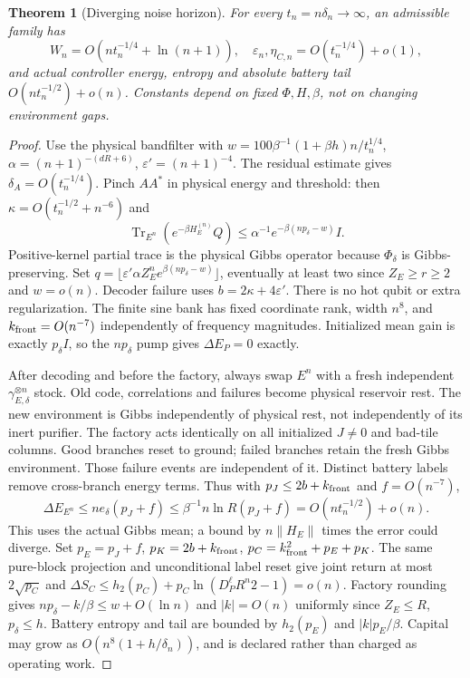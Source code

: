 \documentclass[11pt]{article}
\newtheorem{theorem}{Theorem}
\theoremstyle{definition}
\theoremstyle{remark}
\newcommand{\Tr}{\operatorname{Tr}}
\providecommand{\h}{h_2}
\begin{document}
\begin{theorem}[Diverging noise horizon]\label{bp-noisesuff}
For every $t_n=n\delta_n\to\infty$, an admissible family has
\[
 W_n=O(nt_n^{-1/4}+\ln(n+1)),\quad
 \varepsilon_n,\eta_{C,n}=O(t_n^{-1/4})+o(1),
\]
and actual controller energy, entropy and absolute battery tail
$O(nt_n^{-1/2})+o(n)$. Constants depend on fixed $\Phi,H,\beta$,
not on changing environment gaps.
\end{theorem}
\begin{proof}
Use the physical bandfilter with
$w=100\beta^{-1}(1+\beta h)n/t_n^{1/4}$,
$\alpha=(n+1)^{-(dR+6)}$, $\varepsilon'=(n+1)^{-4}$.
The residual estimate gives $\delta_A=O(t_n^{-1/4})$.
Pinch $AA^*$ in physical energy and threshold: then
$\kappa=O(t_n^{-1/2}+n^{-6})$ and
\[
 \Tr_{E^n}(e^{-\beta H_E^{(n)}}Q)
       \le\alpha^{-1}e^{-\beta(np_\delta-w)}I.
\]
Positive-kernel partial trace is the physical Gibbs operator because
$\Phi_\delta$ is Gibbs-preserving. Set
$q=\lfloor\varepsilon'\alpha Z_E^n e^{\beta(np_\delta-w)}\rfloor$,
eventually at least two since $Z_E\ge r\ge2$ and $w=o(n)$.
Decoder failure uses $b=2\kappa+4\varepsilon'$.
There is no hot qubit or extra regularization. The finite sine bank
has fixed coordinate rank, width $n^8$, and
$k_{\rm front}=O(n^{-7})$ independently of frequency magnitudes.
Initialized mean gain is exactly $p_\delta I$, so the
$np_\delta$ pump gives $\Delta E_P=0$ exactly.

After decoding and before the factory, always swap $E^n$ with a
fresh independent $\gamma_{E,\delta}^{\otimes n}$ stock.
Old code, correlations and failures become physical reservoir rest.
The new environment is Gibbs independently of physical rest, not
independently of its inert purifier. The factory acts identically
on all initialized $J\ne0$ and bad-tile columns.
Good branches reset to ground; failed branches retain the fresh
Gibbs environment. Those failure events are independent of it.
Distinct battery labels remove cross-branch energy terms. Thus
with $p_J\le2b+k_{\rm front}$ and $f=O(n^{-7})$,
\[
 \Delta E_{E^n}\le ne_\delta(p_J+f)
      \le\beta^{-1}n\ln R(p_J+f)=O(nt_n^{-1/2})+o(n).
\]
This uses the actual Gibbs mean; a bound by
$n\|H_E\|$ times the error could diverge.
Set $p_E=p_J+f$, $p_K=2b+k_{\rm front}$,
$p_C=k_{\rm front}^2+p_E+p_K$.
The same pure-block projection and unconditional label reset give
joint return at most $2\sqrt{p_C}$ and
$\Delta S_C\le\h(p_C)+p_C\ln(D_P^\ell R^n2-1)=o(n)$.
Factory rounding gives $np_\delta-k/\beta\le w+O(\ln n)$ and
$|k|=O(n)$ uniformly since $Z_E\le R$, $p_\delta\le h$.
Battery entropy and tail are bounded by $\h(p_E)$ and $|k|p_E/\beta$.
Capital may grow as $O(n^8(1+h/\delta_n))$, and is declared rather
than charged as operating work.
\end{proof}
\end{document}
